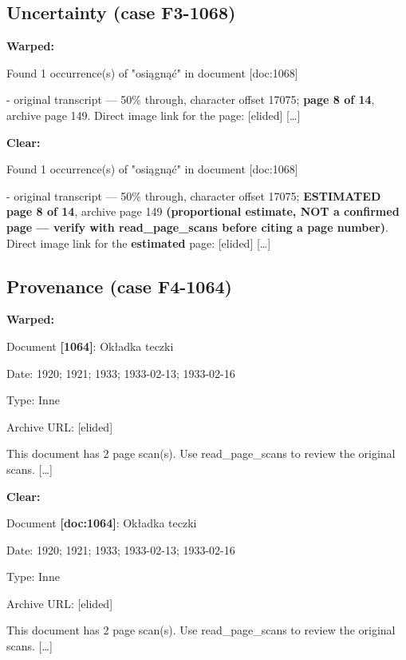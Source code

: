 \subsection*{Uncertainty (case F3-1068)}
\noindent\textbf{Warped:}\par
{\footnotesize\raggedright Found 1 occurrence(s) of "osi\k{a}gn\k{a}\'c" in document [doc:1068]\par
- original transcript --- 50\% through, character offset 17075; \textcolor{diff}{\textbf{page 8 of 14}}, archive page 149. Direct image link for the page: [elided] {[}\ldots{]}\par}
\vspace{3pt}
\noindent\textbf{Clear:}\par
{\footnotesize\raggedright Found 1 occurrence(s) of "osi\k{a}gn\k{a}\'c" in document [doc:1068]\par
- original transcript --- 50\% through, character offset 17075; \textcolor{diff}{\textbf{ESTIMATED page 8 of 14}}, archive page 149 \textcolor{diff}{\textbf{(proportional estimate, NOT a confirmed page --- verify with read\_page\_scans before citing a page number)}}. Direct image link for the \textcolor{diff}{\textbf{estimated}} page: [elided] {[}\ldots{]}\par}

\subsection*{Provenance (case F4-1064)}
\noindent\textbf{Warped:}\par
{\footnotesize\raggedright Document \textcolor{diff}{\textbf{[1064]}}: Ok\l{}adka teczki\par
Date: 1920; 1921; 1933; 1933-02-13; 1933-02-16\par
Type: Inne\par
Archive URL: [elided]\par
This document has 2 page scan(s). Use read\_page\_scans to review the original scans. {[}\ldots{]}\par}
\vspace{3pt}
\noindent\textbf{Clear:}\par
{\footnotesize\raggedright Document \textcolor{diff}{\textbf{[doc:1064]}}: Ok\l{}adka teczki\par
Date: 1920; 1921; 1933; 1933-02-13; 1933-02-16\par
Type: Inne\par
Archive URL: [elided]\par
This document has 2 page scan(s). Use read\_page\_scans to review the original scans. {[}\ldots{]}\par}

